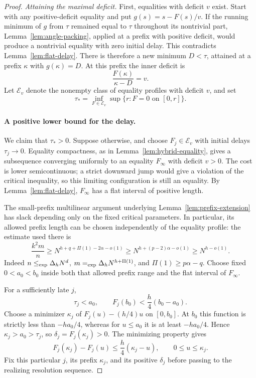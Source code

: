\begin{proof}
\emph{Attaining the maximal deficit.}
First, equalities with deficit $v$ exist. Start with any positive-deficit
equality and put $g(s)=s-F(s)/v$. If the running minimum of $g$ from
$\tau$ remained equal to $\tau$ throughout its nontrivial part,
Lemma~\ref{lem:angle-packing}, applied at a prefix with positive deficit,
would produce a nontrivial equality with zero initial delay. This
contradicts Lemma~\ref{lem:flat-delay}. There is therefore a new minimum
$D<\tau$, attained at a prefix $\kappa$ with
$g(\kappa)=D$. At this prefix the inner deficit is
\[
 \frac{F(\kappa)}{\kappa-D}=v.
\]
Let $\mathcal E_v$ denote the nonempty class of equality profiles with
deficit $v$, and set
\[
 \tau_* =\inf_{F\in\mathcal E_v}
             \sup\{r:F=0\text{ on }[0,r]\}.
\]

\paragraph{A positive lower bound for the delay.}
We claim that $\tau_*>0$. Suppose otherwise, and choose
$F_j\in\mathcal E_v$ with initial delays $\tau_j\to0$. Equality
compactness, as in Lemma~\ref{lem:hybrid-equality}, gives a subsequence
converging uniformly to an equality $F_\infty$ with deficit $v>0$.
The cost is lower semicontinuous; a strict downward jump would give a
violation of the critical inequality, so this limiting configuration is
still an equality. By Lemma~\ref{lem:flat-delay}, $F_\infty$ has a flat
interval of positive length.

The small-prefix multilinear argument underlying
Lemma~\ref{lem:prefix-extension} has slack depending only on the fixed
critical parameters. In particular, its allowed prefix length can be
chosen independently of the equality profile: the estimate used there is
\begin{equation}
 \frac{k^2m}{n}
 \ge N^{h+q+\Pi(1)-2\alpha-o(1)}
 \ge N^{h+(p-2)\alpha-o(1)}
 \ge N^{h-o(1)}.
 \label{eq:uniform-prefix-slack}
\end{equation}
Indeed $n\mathrel{\leq_{\mathrm{exp}}}\Delta_hN^d$,
$m\mathrel{=_{\mathrm{exp}}}\Delta_hN^{h+\Pi(1)}$, and
$\Pi(1)\ge p\alpha-q$. Choose fixed $0<a_0<b_0$ inside both that
allowed prefix range and the flat interval of $F_\infty$.

For a sufficiently late $j$,
\[
 \tau_j<a_0,\qquad
 F_j(b_0)<\frac h4(b_0-a_0).
\]
Choose a minimizer $\kappa_j$ of $F_j(u)-(h/4)u$ on $[0,b_0]$.
At $b_0$ this function is strictly less than $-ha_0/4$, whereas for
$u\le a_0$ it is at least $-ha_0/4$. Hence $\kappa_j>a_0>\tau_j$,
so $\delta_j=F_j(\kappa_j)>0$. The minimizing property gives
\begin{equation}
 F_j(\kappa_j)-F_j(u)
 \le\frac h4(\kappa_j-u),\qquad 0\le u\le\kappa_j.
 \label{eq:late-prefix-record}
\end{equation}
Fix this particular $j$, its prefix $\kappa_j$, and its positive
$\delta_j$ before passing to the realizing resolution sequence.


\end{proof}
